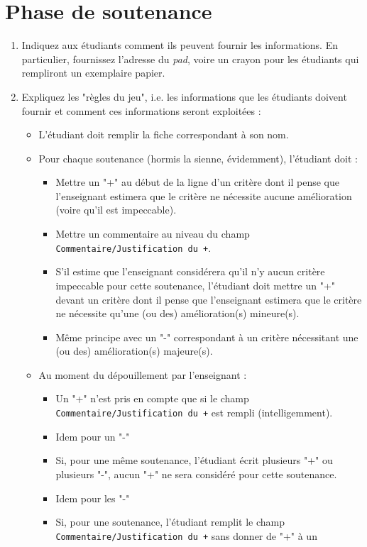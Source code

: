 \documentclass[11pt]{article}
\begin{document}
\section{Phase de soutenance}
\label{sec-5}
\begin{enumerate}
\item Indiquez aux étudiants comment ils peuvent fournir les
informations. En particulier, fournissez l'adresse du \emph{pad}, voire
un crayon pour les étudiants qui rempliront un exemplaire papier.
\item Expliquez les "règles du jeu", i.e. les informations que les
étudiants doivent fournir et comment ces informations seront
exploitées :
\begin{itemize}
\item L'étudiant doit remplir la fiche correspondant à son nom.
\item Pour chaque soutenance (hormis la sienne, évidemment), l'étudiant doit :
\begin{itemize}
\item Mettre un "+" au début de la ligne d'un critère dont il pense
que l'enseignant estimera que le critère ne nécessite aucune
amélioration (voire qu'il est impeccable).
\item Mettre un commentaire au niveau du champ
\verb~Commentaire/Justification du +~.
\item S'il estime que l'enseignant considérera qu'il n'y aucun
critère impeccable pour cette soutenance, l'étudiant doit
mettre un "+" devant un critère dont il pense que l'enseignant
estimera que le critère ne nécessite qu'une (ou des)
amélioration(s) mineure(s).
\item Même principe avec un "-" correspondant à un critère
nécessitant une (ou des) amélioration(s) majeure(s).
\end{itemize}
\item Au moment du dépouillement par l'enseignant :
\begin{itemize}
\item Un "+" n'est pris en compte que si le champ
\verb~Commentaire/Justification du +~ est rempli (intelligemment).
\item Idem pour un "-"
\item Si, pour une même soutenance, l'étudiant écrit plusieurs "+" ou
plusieurs "-", aucun "+" ne sera considéré pour cette
soutenance.
\item Idem pour les "-"
\item Si, pour une soutenance, l'étudiant remplit le champ
\verb~Commentaire/Justification du +~ sans donner de "+" à un

\end{itemize}
\end{itemize}
\end{enumerate}
\end{document}
